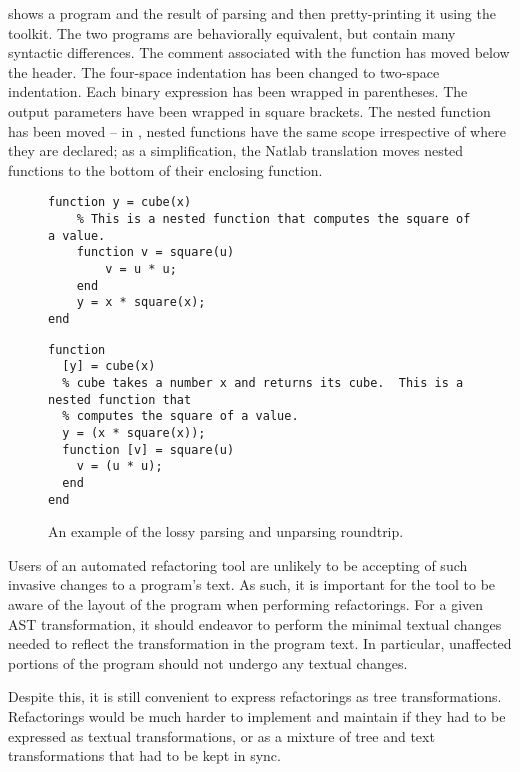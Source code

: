  shows a \matlab program and the result of parsing and
then pretty-printing it using the \mclab toolkit. The two programs are
behaviorally equivalent, but contain many syntactic differences. The comment
associated with the  function has moved below the header. The
four-space indentation has been changed to two-space indentation. Each binary
expression has been wrapped in parentheses.  The output parameters have been
wrapped in square brackets.  The nested function  has been moved
-- in \matlab, nested functions have the same scope irrespective of where they
are declared; as a simplification, the Natlab translation moves nested
functions to the bottom of their enclosing function.

\begin{figure}
\begin{minipage}{0.5\linewidth}
\begin{lstlisting}[numbers=none]
% cube takes a number x and returns its cube.
function y = cube(x)
    % This is a nested function that computes the square of a value.
    function v = square(u)
        v = u * u;
    end
    y = x * square(x);
end
\end{lstlisting}
\end{minipage}
\hfill \hspace{.3cm} \hfill
\begin{minipage}{0.5\linewidth}
\begin{lstlisting}[numbers=none]
function
  [y] = cube(x)
  % cube takes a number x and returns its cube.  This is a nested function that
  % computes the square of a value.
  y = (x * square(x));
  function [v] = square(u)
    v = (u * u);
  end
end
\end{lstlisting}
\end{minipage}
\caption{An example of the lossy parsing and unparsing roundtrip.}
\label{Fig:LostLayout}
\end{figure}

Users of an automated refactoring tool are unlikely to be accepting of such
invasive changes to a program's text. As such, it is important for the tool to
be aware of the layout of the program when performing refactorings. For a given
AST transformation, it should endeavor to perform the minimal textual changes
needed to reflect the transformation in the program text. In particular,
unaffected portions of the program should not undergo any textual changes.

Despite this, it is still convenient to express refactorings as tree
transformations. Refactorings would be much harder to implement and maintain if
they had to be expressed as textual transformations, or as a mixture of tree
and text transformations that had to be kept in sync.

